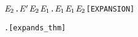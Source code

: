 \begin{alltt}
         \HOLSymConst{\HOLTokenForall{}}\ensuremath{\HOLBoundVar{E}\sb{\mathrm{2}}}. \ensuremath{\HOLBoundVar{E}\sp{\prime}} \HOLTokenTransBegin\HOLSymConst{\ensuremath{\tau}}\HOLTokenTransEnd \ensuremath{\HOLBoundVar{E}\sb{\mathrm{2}}} \HOLSymConst{\HOLTokenImp{}} \HOLSymConst{\HOLTokenExists{}}\ensuremath{\HOLBoundVar{E}\sb{\mathrm{1}}}.  \HOLTokenWeakTransBegin\HOLSymConst{\ensuremath{\tau}}\HOLTokenWeakTransEnd \ensuremath{\HOLBoundVar{E}\sb{\mathrm{1}}} \HOLSymConst{\HOLTokenConj{}}  \ensuremath{\HOLBoundVar{E}\sb{\mathrm{1}}} \ensuremath{\HOLBoundVar{E}\sb{\mathrm{2}}}\hfill{[EXPANSION]}

\HOLTokenTurnstile{}  \HOLSymConst{\HOLTokenExpands{}}  \HOLSymConst{\HOLTokenEquiv{}} \HOLSymConst{\HOLTokenExists{}}.    \HOLSymConst{\HOLTokenConj{}}  \hfill{[expands_thm]}


\end{alltt}
